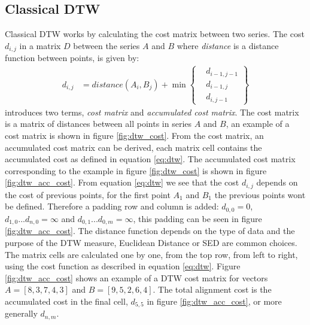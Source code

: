 \subsection{Classical DTW}
Classical DTW works by calculating the cost matrix between two series. The cost $d_{i,j}$ in a matrix $D$ between the series $A$ and $B$ where \textit{distance} is a distance function between points, is given by:
\begin{equation}
    \label{eq:dtw}
    \begin{aligned}
        d_{i, j} & = distance(A_{i}, B_{j}) + \min \left\{ \begin{aligned}
                                                                & d_{i-1, j-1} \\
                                                                & d_{i-1, j}   \\
                                                                & d_{i, j-1}
                                                           \end{aligned} \right\}
    \end{aligned}
\end{equation}
\textcite{muller2007dynamic} introduces two terms, \textit{cost matrix} and \textit{accumulated cost matrix}. The cost matrix is a matrix of distances between all points in series $A$ and $B$, an example of a cost matrix is shown in figure \ref{fig:dtw_cost}. From the cost matrix, an accumulated cost matrix can be derived, each matrix cell contains the accumulated cost as defined in equation \ref{eq:dtw}. The accumulated cost matrix corresponding to the example in figure \ref{fig:dtw_cost} is shown in figure \ref{fig:dtw_acc_cost}. From equation \ref{eq:dtw} we see that the cost $d_{i, j}$ depends on the cost of previous points, for the first point $A_{1}$ and $B_{1}$ the previous points wont be defined. Therefore a padding row and column is added: $d_{0,0} = 0$, $d_{1, 0}...d_{n, 0} = \infty$ and $d_{0, 1}...d_{0, m} = \infty$, this padding can be seen in figure \ref{fig:dtw_acc_cost}. The distance function depends on the type of data and the purpose of the DTW measure, Euclidean Distance or SED are common choices. The matrix cells are calculated one by one, from the top row, from left to right, using the cost function as described in equation \ref{eq:dtw}. Figure \ref{fig:dtw_acc_cost} shows an example of a DTW cost matrix for vectors $A = [8, 3, 7, 4, 3]$ and $B = [9, 5, 2, 6, 4]$. The total alignment cost is the accumulated cost in the final cell, $d_{5,5}$ in figure \ref{fig:dtw_acc_cost}, or more generally $d_{n,m}$.

